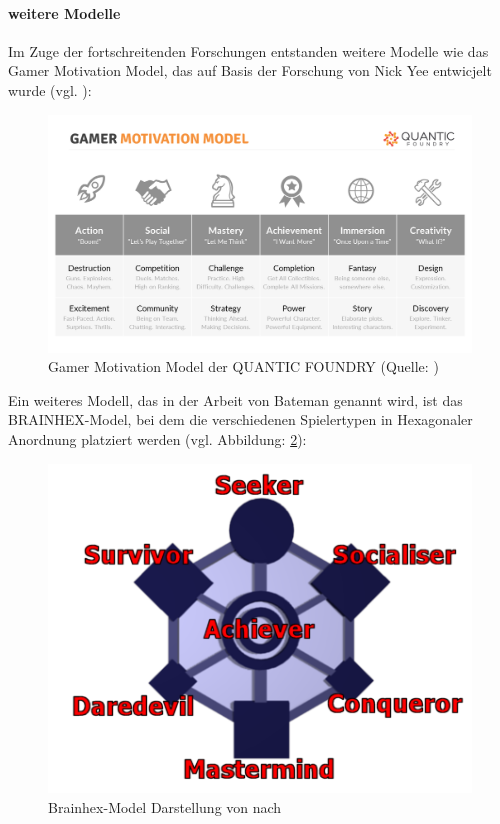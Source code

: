 \paragraph{weitere Modelle}
Im Zuge der fortschreitenden Forschungen entstanden weitere Modelle wie das Gamer Motivation Model, das auf Basis der Forschung von Nick Yee entwicjelt wurde (vgl. \cite{ludologie_spielertypen_nodate}):

\begin{figure}[ht]
\centering
\includegraphics[width=1\linewidth]{content/pictures/gamer_motivations_model.png}
\caption{Gamer Motivation Model der QUANTIC FOUNDRY (Quelle: \cite{noauthor_quantic_nodate})}
\label{fig:gamer_motivation_model}
\end{figure}

Ein weiteres Modell, das in der Arbeit von Bateman genannt wird, ist das BRAINHEX-Model, bei dem die verschiedenen Spielertypen in Hexagonaler Anordnung platziert werden (vgl. Abbildung: \ref{fig:brain-hex}):

\begin{figure}[ht]
\centering
\includegraphics[width=1\linewidth]{content/pictures/brainhex-classes.png}
\caption{Brainhex-Model Darstellung von \cite{noauthor_i_nodate} nach \cite{nacke_brainhex_2013}}
\label{fig:brain-hex}
\end{figure}

